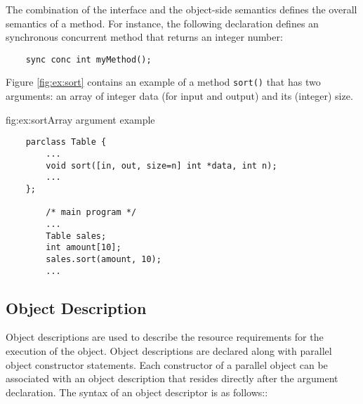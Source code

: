 The combination of the interface and the object-side semantics defines
the overall semantics of a method. For instance, the following
declaration defines an synchronous concurrent method that returns an
integer number:

\begin{verbatim}
    sync conc int myMethod();
\end{verbatim}





Figure \ref{fig:ex:sort} contains an example of a method \texttt{sort()} that
has two arguments: an array of integer data (for input and output) and
its (integer) size.

\begin{figura}{fig:ex:sort}{Array argument example}%
\vspace{-4mm}%
\begin{verbatim}
    parclass Table {
        ...
        void sort([in, out, size=n] int *data, int n);
        ...
    };

        /* main program */
        ...
        Table sales;
        int amount[10];
        sales.sort(amount, 10);
        ...
\end{verbatim}
\end{figura}




\subsection{Object Description}

Object descriptions are used to describe the resource requirements
for the execution of the object. Object descriptions are
declared along with parallel object constructor statements. Each
constructor of a parallel object can be associated with an object
description that resides directly after the argument declaration.
The syntax of an object descriptor is as follows::

